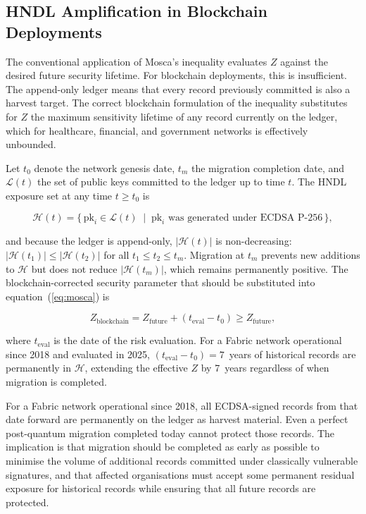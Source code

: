 \documentclass[conference]{IEEEtran}
\begin{document}
\subsection{HNDL Amplification in Blockchain Deployments}

The conventional application of Mosca's inequality evaluates $Z$ against
the desired future security lifetime. For blockchain deployments, this
is insufficient. The append-only ledger means that every record
previously committed is also a harvest target. The correct blockchain
formulation of the inequality substitutes for $Z$ the maximum sensitivity
lifetime of any record currently on the ledger, which for healthcare,
financial, and government networks is effectively unbounded.

Let $t_0$ denote the network genesis date, $t_m$ the migration completion
date, and $\mathcal{L}(t)$ the set of public keys committed to the ledger
up to time $t$. The HNDL exposure set at any time $t \geq t_0$ is

\begin{equation}
\mathcal{H}(t) = \bigl\{\,\mathrm{pk}_i \in \mathcal{L}(t) \;\mid\;
\mathrm{pk}_i \text{ was generated under ECDSA P-256}\,\bigr\},
\label{eq:hndl_set}
\end{equation}

and because the ledger is append-only,
$|\mathcal{H}(t)|$ is non-decreasing: $|\mathcal{H}(t_1)| \leq |\mathcal{H}(t_2)|$
for all $t_1 \leq t_2 \leq t_m$. Migration at $t_m$ prevents new
additions to $\mathcal{H}$ but does not reduce $|\mathcal{H}(t_m)|$,
which remains permanently positive. The blockchain-corrected security
parameter that should be substituted into equation~(\ref{eq:mosca}) is

\begin{equation}
Z_{\mathrm{blockchain}} = Z_{\mathrm{future}} +
(t_{\mathrm{eval}} - t_0) \geq Z_{\mathrm{future}},
\label{eq:mosca_blockchain}
\end{equation}

where $t_{\mathrm{eval}}$ is the date of the risk evaluation. For a
Fabric network operational since 2018 and evaluated in 2025,
$(t_{\mathrm{eval}} - t_0) = 7$~years of historical records are
permanently in $\mathcal{H}$, extending the effective $Z$ by 7~years
regardless of when migration is completed.

For a Fabric network operational since 2018, all ECDSA-signed records
from that date forward are permanently on the ledger as harvest material.
Even a perfect post-quantum migration completed today cannot protect
those records. The implication is that migration should be completed as
early as possible to minimise the volume of additional records committed
under classically vulnerable signatures, and that affected organisations
must accept some permanent residual exposure for historical records while
ensuring that all future records are protected.
\end{document}
